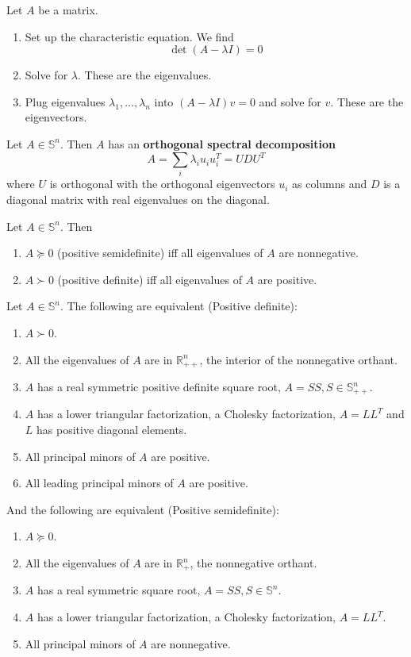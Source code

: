 \begin{theorem}
  Let $A$ be a matrix.
  \begin{enumerate}
    \item Set up the characteristic equation. We find $$\det(A - \lambda I) = 0$$
    \item Solve for $\lambda$. These are the eigenvalues.
    \item Plug eigenvalues $\lambda_1,\ldots, \lambda_n$ into $(A - \lambda I)v = 0$ and solve for $v$. These are the eigenvectors.
  \end{enumerate}
\end{theorem}
\begin{theorem}
  Let $A \in \mathbb S^n$. Then $A$ has an \textbf{orthogonal spectral decomposition}
  $$A = \sum_i \lambda_i u_i u_i^T = UDU^T$$ where $U$ is orthogonal with the orthogonal eigenvectors $u_i$ as columns and $D$ is a diagonal matrix with real eigenvalues on the diagonal.
\end{theorem}
\begin{corollary}
  Let $A \in \mathbb S^n$. Then
  \begin{enumerate}
    \item $A \succeq 0$ (positive semidefinite) iff all eigenvalues of $A$ are nonnegative.
    \item $A \succ 0$ (positive definite) iff all eigenvalues of $A$ are positive.
  \end{enumerate}
\end{corollary}
\begin{proposition}
  Let $A \in \mathbb S^n$. The following are equivalent (Positive definite):
  \begin{enumerate}
    \item $A \succ 0$.
    \item All the eigenvalues of $A$ are in $\mathbb R^n_{++}$, the interior of the nonnegative orthant.
    \item $A$ has a real symmetric positive definite square root, $A = SS, S \in \mathbb S^n_{++}$.
    \item $A$ has a lower triangular factorization, a Cholesky factorization, $A = LL^T$ and $L$ has positive diagonal elements.
    \item All principal minors of $A$ are positive.
    \item All leading principal minors of $A$ are positive.
  \end{enumerate}
  And the following are equivalent (Positive semidefinite):
  \begin{enumerate}
    \item $A \succeq 0$.
    \item All the eigenvalues of $A$ are in $\mathbb R^n_{+}$, the nonnegative orthant.
    \item $A$ has a real symmetric square root, $A = SS, S \in \mathbb S^n$.
    \item $A$ has a lower triangular factorization, a Cholesky factorization, $A = LL^T$.
    \item All principal minors of $A$ are nonnegative.
  \end{enumerate}
\end{proposition}
